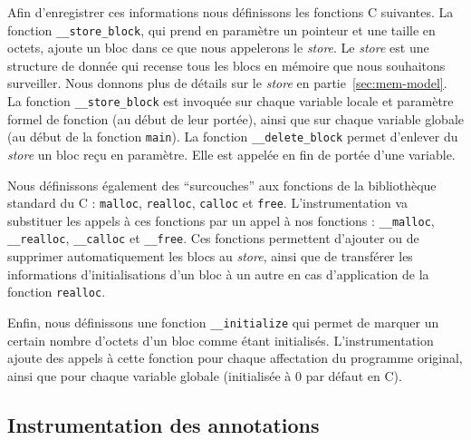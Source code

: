 Afin d'enregistrer ces informations nous définissons les fonctions C suivantes.
La fonction \lstinline'__store_block', qui prend en paramètre un pointeur et une
taille en octets, ajoute un bloc dans ce que nous appelerons le \textit{store}.
Le \textit{store} est une structure de donnée qui recense tous les blocs en
mémoire que nous souhaitons surveiller.
Nous donnons plus de détails sur le \textit{store} en
partie~\ref{sec:mem-model}.
La fonction \lstinline'__store_block' est invoquée sur chaque variable locale
et paramètre formel de fonction (au début de leur portée), ainsi que sur chaque
variable globale (au début de la fonction \lstinline'main').
La fonction \lstinline'__delete_block' permet d'enlever du \textit{store} un
bloc reçu en paramètre.
Elle est appelée en fin de portée d'une variable.

Nous définissons également des ``surcouches'' aux fonctions de la bibliothèque
standard du C : \lstinline'malloc', \lstinline'realloc', \lstinline'calloc' et
\lstinline'free'.
L'instrumentation va substituer les appels à ces fonctions par un appel à nos
fonctions : \lstinline'__malloc', \lstinline'__realloc', \lstinline'__calloc'
et \lstinline'__free'.
Ces fonctions permettent d'ajouter ou de supprimer automatiquement les blocs
au \textit{store}, ainsi que de transférer les informations d'initialisations
d'un bloc à un autre en cas d'application de la fonction \lstinline'realloc'.

Enfin, nous définissons une fonction \lstinline'__initialize' qui permet de
marquer un certain nombre d'octets d'un bloc comme étant initialisés.
L'instrumentation ajoute des appels à cette fonction pour chaque affectation du
programme original, ainsi que pour chaque variable globale (initialisée à 0 par
défaut en C).


\subsection{Instrumentation des annotations}


